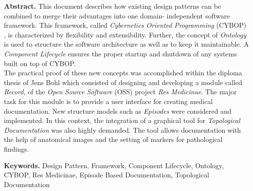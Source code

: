 \textbf{Abstract.} This document describes how existing design
patterns can be combined to merge their advantages into one
domain- independent software framework. This framework, called
\emph{Cybernetics Oriented Programming} (CYBOP) \cite{cyberlink},
is characterized by flexibility and extensibility. Further, the
concept of \emph{Ontology} is used to structure the software
architecture as well as to keep it maintainable. A \emph{Component
Lifecycle} ensures the proper startup and shutdown of any systems
built on top
of CYBOP.\\
The practical proof of these new concepts was accomplished within
the diploma thesis of Jens Bohl \cite{reform} which consisted of
designing and developing a module called \emph{Record}, of the
\emph{Open Source Software} (OSS) project \emph{Res Medicinae}.
The major task for this module is to provide a user interface for
creating medical documentation. New structure models such as
\emph{Episodes} were considered and implemented. In this context,
the integration of a graphical tool for \emph{Topological
Documentation} was also highly demanded. The tool allows
documentation with the help of anatomical images and the setting
of markers for pathological findings.

\textbf{Keywords.} Design Pattern, Framework, Component Lifecycle,
Ontology, CYBOP, Res Medicinae, Episode Based Documentation,
Topological Documentation
